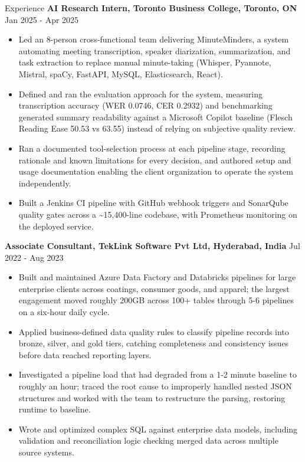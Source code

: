 \documentclass{resume}
\begin{document}
\begin{rSection}{Experience}
\vspace{0.4em}
\textbf{AI Research Intern, Toronto Business College, Toronto, ON} \hfill Jan 2025 - Apr 2025
\begin{itemize}
    \item Led an 8-person cross-functional team delivering MinuteMinders, a system automating meeting transcription, speaker diarization, summarization, and task extraction to replace manual minute-taking (Whisper, Pyannote, Mistral, spaCy, FastAPI, MySQL, Elasticsearch, React).
    \item Defined and ran the evaluation approach for the system, measuring transcription accuracy (WER 0.0746, CER 0.2932) and benchmarking generated summary readability against a Microsoft Copilot baseline (Flesch Reading Ease 50.53 vs 63.55) instead of relying on subjective quality review.
    \item Ran a documented tool-selection process at each pipeline stage, recording rationale and known limitations for every decision, and authored setup and usage documentation enabling the client organization to operate the system independently.
    \item Built a Jenkins CI pipeline with GitHub webhook triggers and SonarQube quality gates across a \textasciitilde{}15,400-line codebase, with Prometheus monitoring on the deployed service.
\end{itemize}

\textbf{Associate Consultant, TekLink Software Pvt Ltd, Hyderabad, India} \hfill Jul 2022 - Aug 2023
\begin{itemize}
    \item Built and maintained Azure Data Factory and Databricks pipelines for large enterprise clients across coatings, consumer goods, and apparel; the largest engagement moved roughly 200GB across 100+ tables through 5-6 pipelines on a six-hour daily cycle.
    \item Applied business-defined data quality rules to classify pipeline records into bronze, silver, and gold tiers, catching completeness and consistency issues before data reached reporting layers.
    \item Investigated a pipeline load that had degraded from a 1-2 minute baseline to roughly an hour; traced the root cause to improperly handled nested JSON structures and worked with the team to restructure the parsing, restoring runtime to baseline.
    \item Wrote and optimized complex SQL against enterprise data models, including validation and reconciliation logic checking merged data across multiple source systems.
\end{itemize}


\end{rSection}
\end{document}
